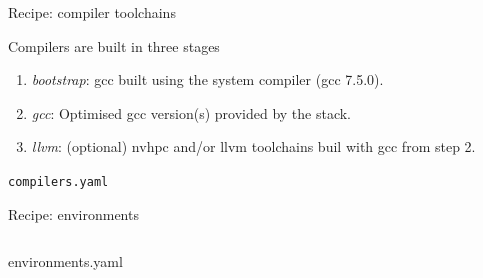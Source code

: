 \documentclass[aspectratio=43]{beamer}
\begin{document}
\begin{frame}[fragile]{Recipe: compiler toolchains}

Compilers are built in three stages
\begin{enumerate}
\item \emph{bootstrap}: gcc built using the system compiler (gcc 7.5.0).
\item \emph{gcc}: Optimised gcc version(s) provided by the stack.
\item \emph{llvm}: (optional) nvhpc and/or llvm toolchains buil with gcc from step 2.
\end{enumerate}


\begin{code}{\lstinline{compilers.yaml}}

\end{code}

\end{frame}

\begin{frame}[fragile]{Recipe: environments}

    \begin{columns}[T]
        \begin{column}{0.5\textwidth}
        \begin{codecolumn}{environments.yaml}

        \end{codecolumn}
        \end{column}
        \begin{column}{0.5\textwidth}
        \begin{codecolumnnotitle}{}

        \end{codecolumnnotitle}
        \end{column}
    \end{columns}

\end{frame}
\end{document}
